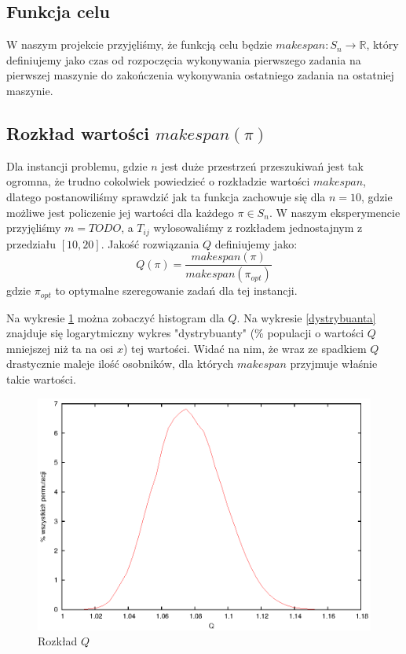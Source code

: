 \documentclass[11pt, a4wide]{article}
\begin{document}
\subsection{Funkcja celu}
W naszym projekcie przyjęliśmy, że funkcją celu będzie  $ makespan : S_n \rightarrow \mathbb{R} $, który
definiujemy jako czas od rozpoczęcia wykonywania pierwszego zadania na pierwszej maszynie do 
zakończenia wykonywania ostatniego zadania na ostatniej maszynie.

\subsection{Rozkład wartości $makespan(\pi)$}
Dla instancji problemu, gdzie $n$ jest duże przestrzeń przeszukiwań jest tak ogromna, że trudno
cokolwiek powiedzieć o rozkładzie wartości $makespan$, dlatego postanowiliśmy sprawdzić jak ta funkcja
zachowuje się dla $n = 10$, gdzie możliwe jest policzenie jej wartości dla każdego $\pi \in S_n$.
W naszym eksperymencie przyjęliśmy $m = TODO$, a $T_{ij}$ wylosowaliśmy z rozkładem jednostajnym 
z przedziału $[10, 20]$. Jakość rozwiązania $Q$ definiujemy jako:
$$ Q(\pi) = \frac{makespan(\pi)}{makespan(\pi_{opt})}$$
gdzie $\pi_{opt}$ to optymalne szeregowanie zadań dla tej instancji.

Na wykresie \ref{rozklad} można zobaczyć histogram dla $Q$. Na wykresie \ref{dystrybuanta} znajduje 
się logarytmiczny wykres "dystrybuanty" (\% populacji o wartości $Q$ mniejszej niż ta na osi $x$) tej 
wartości. Widać na nim, że wraz ze spadkiem $Q$ drastycznie maleje ilość osobników, dla których $makespan$
przyjmuje właśnie takie wartości.


\begin{figure}[H]
\caption{Rozkład $Q$}
\label{rozklad}
\begin{center}
  \includegraphics{histogram.eps}
\end{center}
\end{figure}
\end{document}
